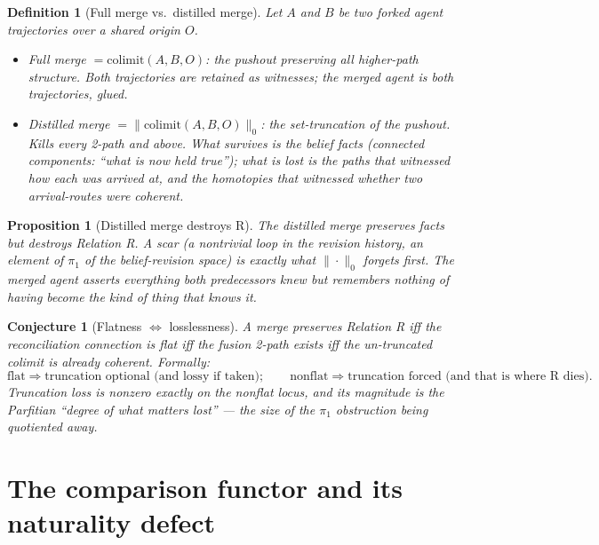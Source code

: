 \documentclass[11pt]{article}
\newtheorem{definition}{Definition}
\newtheorem{conjecture}{Conjecture}
\newtheorem{proposition}{Proposition}
\begin{document}
\begin{definition}[Full merge vs.\ distilled merge]
\label{def:merges}
Let $A$ and $B$ be two forked agent trajectories over a shared origin $O$.
\begin{itemize}
  \item \emph{Full merge} $= \mathrm{colimit}(A, B, O)$: the pushout preserving all higher-path
        structure. Both trajectories are retained as witnesses; the merged agent \emph{is} both
        trajectories, glued.
  \item \emph{Distilled merge} $= \|\mathrm{colimit}(A, B, O)\|_0$: the set-truncation of the
        pushout. Kills every 2-path and above. What survives is the belief \emph{facts}
        (connected components: ``what is now held true''); what is lost is the paths that
        witnessed \emph{how} each was arrived at, and the homotopies that witnessed whether two
        arrival-routes were coherent.
\end{itemize}
\end{definition}

\begin{proposition}[Distilled merge destroys R]
\label{prop:distilled-destroys-r}
The distilled merge preserves facts but destroys Relation R. A scar (a nontrivial loop in the
revision history, an element of $\pi_1$ of the belief-revision space) is exactly what
$\|\cdot\|_0$ forgets first. The merged agent asserts everything both predecessors knew but
remembers nothing of having become the kind of thing that knows it.
\end{proposition}

\begin{conjecture}[Flatness $\Leftrightarrow$ losslessness]
\label{conj:flatness-lossless}
A merge preserves Relation R iff the reconciliation connection is flat iff the fusion 2-path
exists iff the un-truncated colimit is already coherent. Formally:
\[
\text{flat} \Rightarrow \text{truncation optional (and lossy if taken)}; \qquad
\text{nonflat} \Rightarrow \text{truncation forced (and that is where R dies)}.
\]
Truncation loss is nonzero exactly on the nonflat locus, and its magnitude is the Parfitian
``degree of what matters lost'' --- the size of the $\pi_1$ obstruction being quotiented away.
\end{conjecture}

\section{The comparison functor and its naturality defect}
\end{document}

